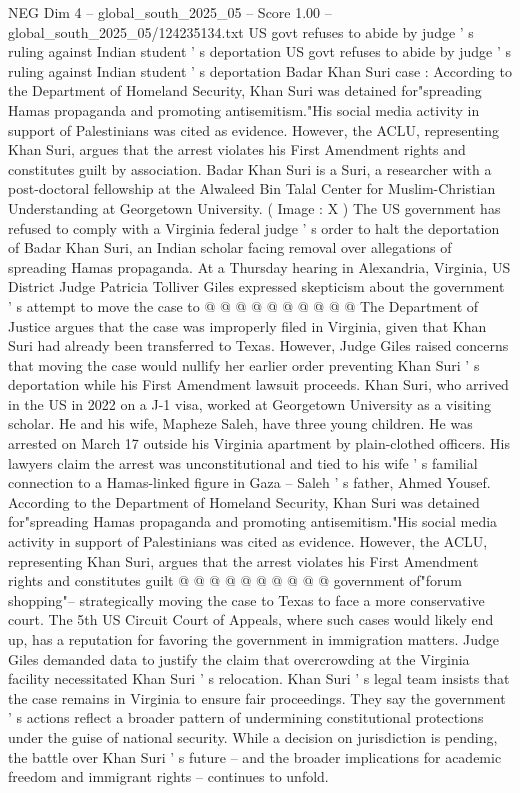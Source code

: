\begin{textsample}{NEG Dim 4 – global\_south\_2025\_05 – Score 1.00 – global\_south\_2025\_05/124235134.txt}  \label{ex:f4_neg_361}
US govt refuses to abide by judge ' s ruling against Indian student ' s deportation US govt refuses to abide by judge ' s ruling against Indian student ' s deportation Badar Khan Suri case : According to the Department of Homeland Security, Khan Suri was detained for"spreading Hamas propaganda and promoting antisemitism."His social media activity in support of Palestinians was cited as evidence.
However, the ACLU, representing Khan Suri, argues that the arrest violates his First Amendment rights and constitutes guilt by association.
Badar Khan Suri is a Suri, a researcher with a post-doctoral fellowship at the Alwaleed Bin Talal Center for Muslim-Christian Understanding at Georgetown University. ( Image : X ) The US government has refused to comply with a Virginia federal judge ' s order to halt the deportation of Badar Khan Suri, an Indian scholar facing removal over allegations of spreading Hamas propaganda.
At a Thursday hearing in Alexandria, Virginia, US District Judge Patricia Tolliver Giles expressed skepticism about the government ' s attempt to move the case to @ @ @ @ @ @ @ @ @ @ The Department of Justice argues that the case was improperly filed in Virginia, given that Khan Suri had already been transferred to Texas.
However, Judge Giles raised concerns that moving the case would nullify her earlier order preventing Khan Suri ' s deportation while his First Amendment lawsuit proceeds.
Khan Suri, who arrived in the US in 2022 on a J-1 visa, worked at Georgetown University as a visiting scholar.
He and his wife, Mapheze Saleh, have three young children.
He was arrested on March 17 outside his Virginia apartment by plain-clothed officers.
His lawyers claim the arrest was unconstitutional and tied to his wife ' s familial connection to a Hamas-linked figure in Gaza -- Saleh ' s father, Ahmed Yousef.
According to the Department of Homeland Security, Khan Suri was detained for"spreading Hamas propaganda and promoting antisemitism."His social media activity in support of Palestinians was cited as evidence.
However, the ACLU, representing Khan Suri, argues that the arrest violates his First Amendment rights and constitutes guilt @ @ @ @ @ @ @ @ @ @ government of"forum shopping"-- strategically moving the case to Texas to face a more conservative court.
The 5th US Circuit Court of Appeals, where such cases would likely end up, has a reputation for favoring the government in immigration matters.
Judge Giles demanded data to justify the claim that overcrowding at the Virginia facility necessitated Khan Suri ' s relocation.
Khan Suri ' s legal team insists that the case remains in Virginia to ensure fair proceedings.
They say the government ' s actions reflect a broader pattern of undermining constitutional protections under the guise of national security.
While a decision on jurisdiction is pending, the battle over Khan Suri ' s future -- and the broader implications for academic freedom and immigrant rights -- continues to unfold.

\end{textsample}
